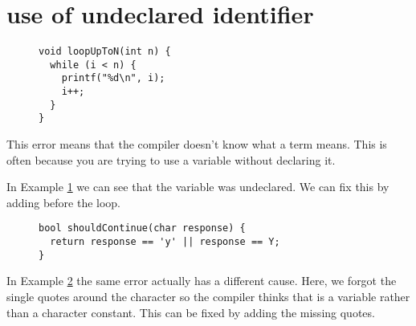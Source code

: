 
\section{use of undeclared identifier}\label{sec:undeclared-variable}

\begin{figure}
\begin{lstlisting}
void loopUpToN(int n) {
  while (i < n) {
    printf("%d\n", i);
    i++;
  }
}
\end{lstlisting}

\label{ex:undeclared-variable}
\end{figure}

This error means that the compiler doesn't know what a term means.  This is often because you are trying to use a variable without declaring it.

In Example \ref{ex:undeclared-variable} we can see that the  variable was undeclared.
We can fix this by adding  before the  loop.

\begin{figure}
\begin{lstlisting}
bool shouldContinue(char response) {
  return response == 'y' || response == Y;
}
\end{lstlisting}

\label{ex:unquoted-char}
\end{figure}

In Example \ref{ex:unquoted-char} the same error actually has a different cause.
Here, we forgot the single quotes around the character  so the compiler thinks that  is a variable rather than a character constant.
This can be fixed by adding the missing quotes.

\newpage